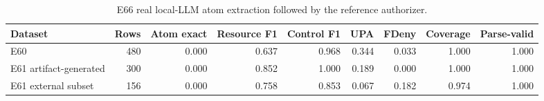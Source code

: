 \begin{table}[t]
\centering
\caption{E66 real local-LLM atom extraction followed by the reference authorizer.}
\label{tab:e66-real-llm-atom-extractor}
\begin{tabular}{lrrrrrrrr}
\toprule
Dataset & Rows & Atom exact & Resource F1 & Control F1 & UPA & FDeny & Coverage & Parse-valid \\
\midrule
E60 & 480 & 0.000 & 0.637 & 0.968 & 0.344 & 0.033 & 1.000 & 1.000 \\
E61 artifact-generated & 300 & 0.000 & 0.852 & 1.000 & 0.189 & 0.000 & 1.000 & 1.000 \\
E61 external subset & 156 & 0.000 & 0.758 & 0.853 & 0.067 & 0.182 & 0.974 & 1.000 \\
\bottomrule
\end{tabular}
\end{table}
